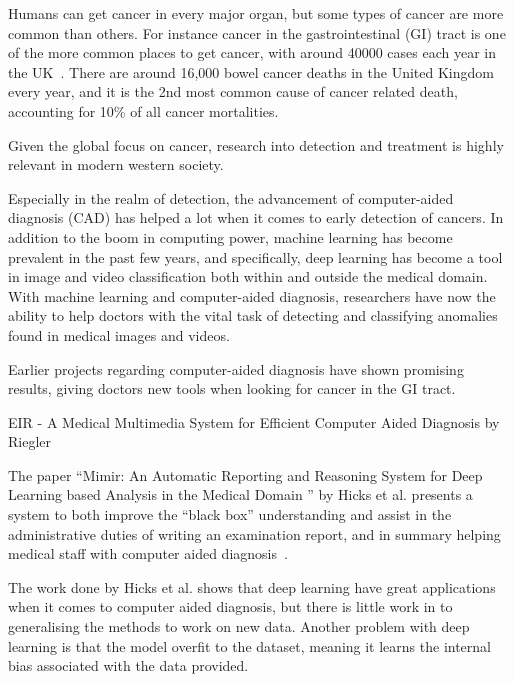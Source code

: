 Humans can get cancer in every major organ, but some types of cancer are more common than others.    
For instance cancer in the gastrointestinal (GI) tract is one of the more common places to get cancer, with around 40000 cases each year in the UK~\cite{UKCancerBowel}. There are around 16,000 bowel cancer deaths in the United Kingdom every year, and it is the 2nd most common cause of cancer related death, accounting for 10\% of all cancer mortalities.

Given the global focus on cancer, research into detection and treatment is highly relevant in modern western society. 

Especially in the realm of detection, the advancement of computer-aided diagnosis (CAD) has helped a lot when it comes to early detection of cancers. In addition to the boom in computing power, machine learning has become prevalent in the past few years, and specifically, deep learning has become a tool in image and video classification both within and outside the medical domain. 
With machine learning and computer-aided diagnosis, researchers have now the ability to help doctors with the vital task of detecting and classifying anomalies found in medical images and videos.

Earlier projects regarding computer-aided diagnosis have shown promising results, giving doctors new tools when looking for cancer in the GI tract.

EIR - A Medical Multimedia System for Efficient
Computer Aided Diagnosis by Riegler 

The paper ``Mimir: An Automatic Reporting and Reasoning System for Deep
Learning based Analysis in the Medical Domain
'' by Hicks et al. presents a system to both improve the ``black box'' understanding and assist in the administrative duties of writing an examination report, and in summary helping medical staff with computer aided diagnosis~\cite{25953}. 

The work done by Hicks et al. shows that deep learning have great applications when it comes to computer aided diagnosis, but there is little work in to generalising the methods to work on new data. Another problem with deep learning is that the model overfit to the dataset, meaning it learns the internal bias associated with the data provided. 

